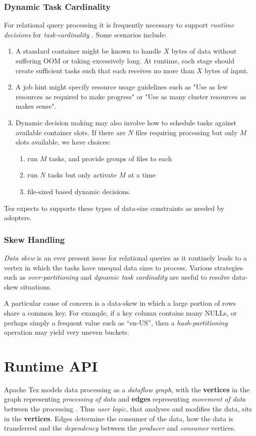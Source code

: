 \documentclass[twocolumn]{article}
\newcommand{\be}{\begin{enumerate}}
\newcommand{\ee}{\end{enumerate}}
\newcommand{\ii}{\item}
\begin{document}
\subsubsection*{Dynamic Task Cardinality}
For relational query processing it is frequently necessary to support \textit{runtime decisions} for\textit{ task-cardinality} \cite{hortonworks}.  Some scenarios include:

\be
\ii A standard container might be known to handle $X$ bytes of data without suffering OOM or taking excessively long.  
At runtime, each stage should create sufficient tasks such that each receives no more than $X$ bytes of input.
\ii A job hint might specify resource usage guidelines such as "Use as few resources as required to make progress" or "Use as many cluster resources as makes sense".   
\ii Dynamic decision making may also involve how to schedule tasks against available container slots.  
If there are $N$ files requiring processing but only $M$ slots available, we have choices:
\be
\ii run $M$ tasks, and provide groups of files to each
\ii run $N$ tasks but only activate $M$ at a time
\ii file-sized based dynamic decisions.
\ee
\ee
Tez expects to supports these types of data-size constraints as needed by adopters. 

\subsubsection*{Skew Handling}
\textit{Data skew} is an ever present issue for relational queries as it routinely leads to a vertex in which the tasks have unequal data sizes to process.  Various strategies such as \textit{over-partitioning} and \textit{dynamic task cardinality} are useful to resolve data-skew situations.  

A particular cause of concern is a data-skew in which a large portion of rows share a common key.  For example, if a key column contains many NULLs, or perhaps simply a frequent value such as “en-US”, then a \textit{hash-partitioning} operation may yield very uneven buckets.

\section{Runtime API}
Apache Tez models data processing as a \emph{dataflow graph}, with the
\textbf{vertices} in the graph representing \emph{processing of data}
and \textbf{edges} representing \emph{movement of data} between the
processing \cite{Saha:2013-03}. Thus \emph{user logic}, that analyses and modifies the data,
sits in the \textbf{vertices}. Edges determine the consumer of the data,
how the data is transferred and the \emph{dependency} between the
\emph{producer} and \emph{consumer} vertices.
\end{document}
